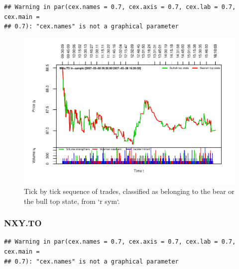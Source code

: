 \documentclass[]{article}
\begin{document}
\begin{verbatim}
## Warning in par(cex.names = 0.7, cex.axis = 0.7, cex.lab = 0.7, cex.main =
## 0.7): "cex.names" is not a graphical parameter
\end{verbatim}

\begin{figure}[H]
\includegraphics[width=\textwidth]{main_files/figure-latex/unnamed-chunk-38-1} \caption{Tick by tick sequence of trades, classified as belonging to the bear or the bull top state, from `r sym`.}\label{fig:unnamed-chunk-38}
\end{figure}

\newpage

\subsubsection{NXY.TO}\label{nxy.to}

\begin{verbatim}
## Warning in par(cex.names = 0.7, cex.axis = 0.7, cex.lab = 0.7, cex.main =
## 0.7): "cex.names" is not a graphical parameter
\end{verbatim}
\end{document}
